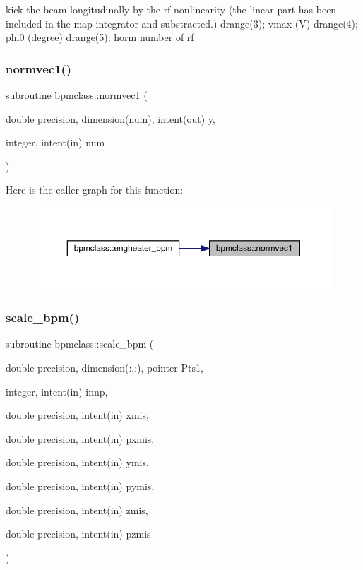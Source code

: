 kick the beam longitudinally by the rf nonlinearity (the linear part has been included in the map integrator and substracted.) drange(3); vmax (V) drange(4); phi0 (degree) drange(5); horm number of rf 

\mbox{\label{namespacebpmclass_ab4b58d389b1b0c7169a20e75f2f32389}} 
\subsubsection{\texorpdfstring{normvec1()}{normvec1()}}
{\footnotesize\ttfamily subroutine bpmclass\+::normvec1 (\begin{DoxyParamCaption}\item[{double precision, dimension(num), intent(out)}]{y,  }\item[{integer, intent(in)}]{num }\end{DoxyParamCaption})}

Here is the caller graph for this function\+:\nopagebreak
\begin{figure}[H]
\begin{center}
\leavevmode
\includegraphics[width=350pt]{namespacebpmclass_ab4b58d389b1b0c7169a20e75f2f32389_icgraph}
\end{center}
\end{figure}
\mbox{\label{namespacebpmclass_a2260a4affb3b3dc90db1d734a5e73b11}} 
\subsubsection{\texorpdfstring{scale\_bpm()}{scale\_bpm()}}
{\footnotesize\ttfamily subroutine bpmclass\+::scale\+\_\+bpm (\begin{DoxyParamCaption}\item[{double precision, dimension(\+:,\+:), pointer}]{Pts1,  }\item[{integer, intent(in)}]{innp,  }\item[{double precision, intent(in)}]{xmis,  }\item[{double precision, intent(in)}]{pxmis,  }\item[{double precision, intent(in)}]{ymis,  }\item[{double precision, intent(in)}]{pymis,  }\item[{double precision, intent(in)}]{zmis,  }\item[{double precision, intent(in)}]{pzmis }\end{DoxyParamCaption})}

